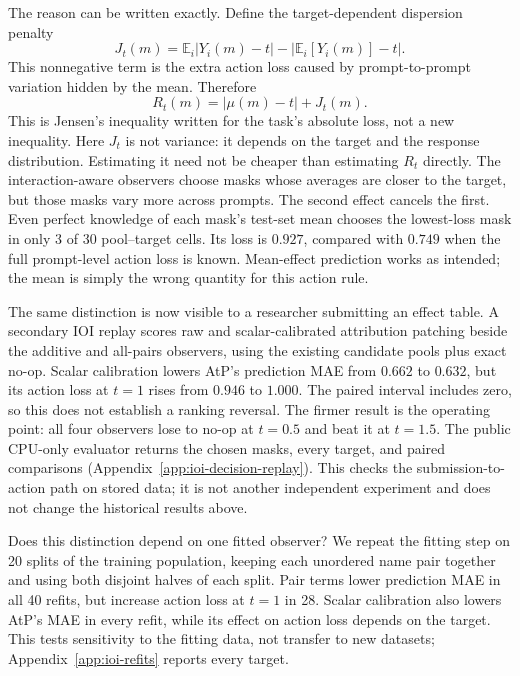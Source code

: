 The reason can be written exactly. Define the target-dependent dispersion
penalty
\[
J_t(m)=\mathbb E_i|Y_i(m)-t|-|\mathbb E_i[Y_i(m)]-t|.
\]
This nonnegative term is the extra action loss caused by prompt-to-prompt
variation hidden by the mean. Therefore
\begin{equation}
\label{eq:dispersion}
R_t(m)=|\mu(m)-t|+J_t(m).
\end{equation}
This is Jensen's inequality written for the task's absolute loss, not a new
inequality. Here $J_t$ is not variance: it depends on the target and the
response distribution. Estimating it need not be cheaper than estimating
$R_t$ directly.
The interaction-aware observers choose masks whose averages are closer to the
target, but those masks vary more across prompts. The second effect cancels the
first. Even perfect knowledge of each mask's test-set mean chooses the
lowest-loss mask in only 3 of 30 pool--target cells. Its loss is $0.927$,
compared with $0.749$ when the full prompt-level action loss is known.
Mean-effect prediction works as intended; the mean is simply the wrong
quantity for this action rule.

The same distinction is now visible to a researcher submitting an effect
table. A secondary IOI replay scores raw and scalar-calibrated attribution
patching \cite{syed2024attribution} beside the additive and all-pairs observers,
using the existing candidate pools plus exact no-op. Scalar calibration lowers
AtP's prediction MAE from $0.662$ to $0.632$, but its action loss at $t=1$
rises from $0.946$ to $1.000$. The paired interval includes zero, so this
does not establish a ranking reversal. The firmer result is the operating
point: all four observers lose to no-op at $t=0.5$ and beat it at $t=1.5$.
The public CPU-only evaluator returns the chosen masks, every target, and
paired comparisons (Appendix~\ref{app:ioi-decision-replay}). This checks the
submission-to-action path on stored data; it is not another independent
experiment and does not change the historical results above.

Does this distinction depend on one fitted observer? We repeat the fitting
step on 20 splits of the training population, keeping each unordered name
pair together and using both disjoint halves of each split. Pair terms lower
prediction MAE in all 40 refits, but increase action loss at $t=1$ in 28.
Scalar calibration also lowers AtP's MAE in every refit, while its effect on
action loss depends on the target. This tests sensitivity to the fitting data,
not transfer to new datasets; Appendix~\ref{app:ioi-refits} reports every target.


